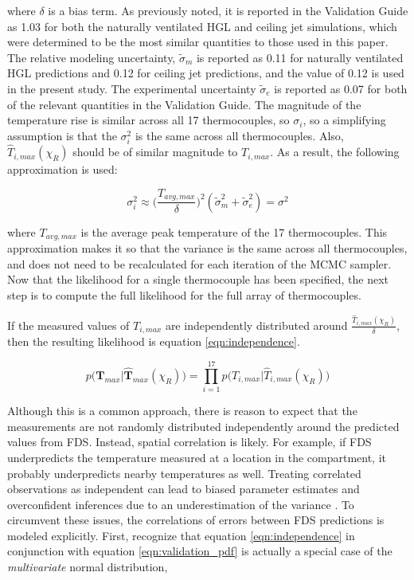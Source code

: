\documentclass{article}
\begin{document}
\noindent where $\delta$ is a bias term. As previously noted, it is reported in the Validation Guide as 1.03 for both the naturally ventilated HGL and ceiling jet simulations, which were determined to be the most similar quantities to those used in this paper. The relative modeling uncertainty, $\tilde{\sigma}_m$ is reported as 0.11 for naturally ventilated HGL predictions and 0.12 for ceiling jet predictions, and the value of 0.12 is used in the present study. The experimental uncertainty $\tilde{\sigma}_e$ is reported as 0.07 for both of the relevant quantities in the Validation Guide. The magnitude of the temperature rise is similar across all 17 thermocouples, so $\sigma_i$, so a simplifying assumption is that the $\sigma_i^2$ is the same across all thermocouples. Also, 
$\hat{T}_{i,max}(\chi_R)$ should be of similar magnitude to $T_{i,max}$. As a result, the following approximation is used:

 \begin{equation}
  \label{eqn:sigma_assumption}
  \sigma_i^2 \approx \bigg(\frac{T_{avg, max}}{\delta}\bigg)^2 (\tilde{\sigma}_m^2 + \tilde{\sigma}_e^2) = \sigma^2
\end{equation}

where $T_{avg, max}$ is the average peak temperature of the 17 thermocouples. This approximation makes it so that the variance is the same across all thermocouples, and does not need to be recalculated for each iteration of the MCMC sampler. Now that the likelihood for a single thermocouple has been specified, the next step is to compute the full likelihood for the full array of thermocouples. 




If the measured values of $T_{i,max}$ are independently distributed around $\frac{\hat{T}_{i,max}(\chi_R)}{\delta}$, then the resulting likelihood is equation \ref{eqn:independence}.

\begin{equation}
  \label{eqn:independence}
  p\bigg(\boldsymbol{T}_{max} \bigg| \boldsymbol{\hat{T}}_{max}(\chi_R)\bigg) = \prod_{i=1}^{17} p\bigg(T_{i,max} \big| \hat{T}_{i,max}(\chi_R)\bigg)
\end{equation}

Although this is a common approach, there is reason to expect that the measurements are not randomly distributed independently around the predicted values from FDS. Instead, spatial correlation is likely. For example, if FDS underpredicts the temperature measured at a location in the compartment, it probably underpredicts nearby temperatures as well. Treating correlated observations as independent can lead to biased parameter estimates and overconfident inferences due to an underestimation of the variance \cite{dormann2007effects}. To circumvent these issues, the correlations of errors between FDS predictions is modeled explicitly. First, recognize that equation \ref{eqn:independence} in conjunction with equation \ref{eqn:validation_pdf} is actually a special case of the \textit{multivariate} normal distribution, 
\end{document}
